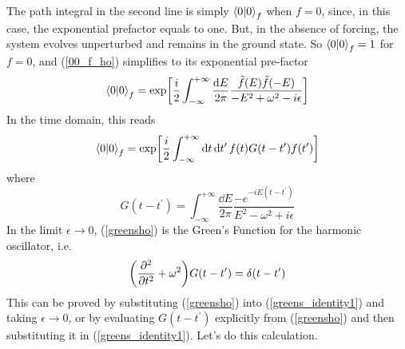 The path integral in the second line is simply $\braket{0}_f$ when $f=0$, since, in this case, the exponential prefactor equals to one. But, in the absence of forcing, the system evolves unperturbed and remains in the ground state. So $\braket{0}_f=1$ for $f=0$, and (\ref{00_f_ho}) simplifies to its exponential pre-factor
\begin{equation}
    \braket{0}_f=\exp[\frac{i}{2}\int_{-\infty}^{+\infty}\frac{\dd E}{2\pi}\frac{\tilde{f}(E)\tilde{f}(-E)}{-E^2+\omega^2-i\epsilon}]
\end{equation}
In the time domain, this reads
\begin{equation}
    \braket{0}_f=\exp[\frac{i}{2}\int_{-\infty}^{+\infty}\dd t\,\dd t^\prime\,f(t)G(t-t^\prime)f(t^\prime)]
    \label{00_f_time_domain}
\end{equation}
where 
\begin{equation}
    G(t-t^\prime)=\int_{-\infty}^{+\infty}\frac{\dd E}{2\pi}\frac{-e^{-iE(t-t^\prime)}}{E^2-\omega^2+i\epsilon}
    \label{greensho}
\end{equation}
In the limit $\epsilon\to0$, (\ref{greensho}) is the Green's Function for the harmonic oscillator, i.e.
\begin{equation}
    \qty(\pdv[2]{t}+\omega^2)G(t-t^\prime)=\delta(t-t^\prime)
    \label{greens_identity1}
\end{equation}
This can be proved by substituting (\ref{greensho}) into (\ref{greens_identity1}) and taking $\epsilon\to0$, or by evaluating $G(t-t^\prime)$ explicitly from (\ref{greensho}) and then substituting it in (\ref{greens_identity1}). Let's do this calculation.\\

